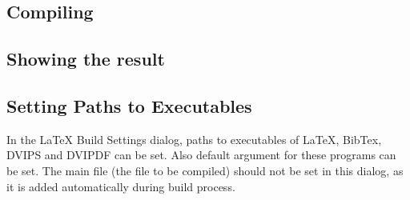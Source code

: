 \documentclass{article}
\begin{document}
\subsection{Compiling}

\subsection{Showing the result}

\subsection{Setting Paths to Executables}

\label{ssec:setting:paths}

In the LaTeX Build Settings dialog, paths to executables of \LaTeX, BibTex, DVIPS and DVIPDF
can be set. Also default argument for these programs can be set. The main file
(the file to be compiled) should not be set in this dialog, as it is added automatically
during build process.


\end{document}
